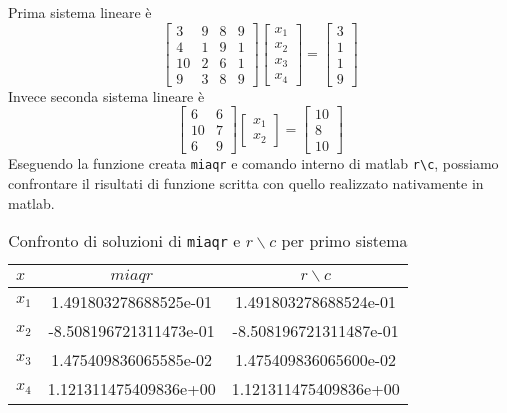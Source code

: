 Prima sistema lineare è
\[
   \begin{bmatrix}
      3  & 9 & 8 & 9 \\
      4  & 1 & 9 & 1 \\
      10 & 2 & 6 & 1 \\
      9  & 3 & 8 & 9
   \end{bmatrix}
   \begin{bmatrix}
      x_{1} \\
      x_{2} \\
      x_{3} \\
      x_{4}
   \end{bmatrix}
   =
   \begin{bmatrix}
      3 \\
      1 \\
      1 \\
      9
   \end{bmatrix}
\]
Invece seconda sistema lineare è
\[
   \begin{bmatrix}
      6  & 6 \\
      10 & 7 \\
      6  & 9
   \end{bmatrix}
   \begin{bmatrix}
      x_{1} \\
      x_{2}
   \end{bmatrix}
   =
   \begin{bmatrix}
      10 \\
      8  \\
      10
   \end{bmatrix}
\]
Eseguendo la funzione creata \lstinline{miaqr} e comando interno di
matlab \lstinline{r\c}, possiamo confrontare il risultati di funzione
scritta con quello realizzato nativamente in matlab.
\begin{table}[ht]
   \centering
   \renewcommand\arraystretch{2}
   \begin{tabular}{|l | c c |}
      \hline
      $x$     & $miaqr$                & $r \backslash c$       \\
      \hline
      $x_{1}$ & 1.491803278688525e-01  & 1.491803278688524e-01  \\
      $x_{2}$ & -8.508196721311473e-01 & -8.508196721311487e-01 \\
      $x_{3}$ & 1.475409836065585e-02  & 1.475409836065600e-02  \\
      $x_{4}$ & 1.121311475409836e+00  & 1.121311475409836e+00  \\
      \hline
   \end{tabular}
   \caption{Confronto di soluzioni di \lstinline{miaqr} e $r \backslash c$ per primo sistema}
   \label{tab:12_1}
\end{table}
